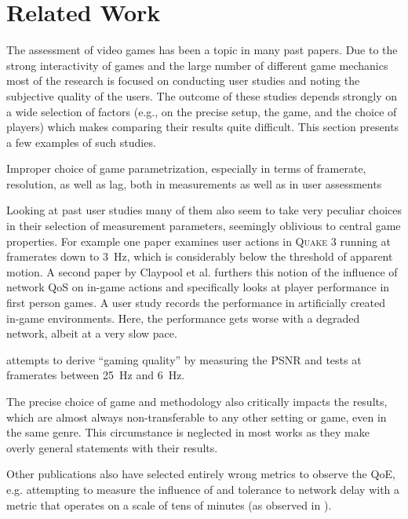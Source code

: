 \section{Related Work}
\label{sec:relatedwork}

The assessment of video games has been a topic in many past papers. Due to the strong interactivity of games and the large number of different game mechanics most of the research is focused on conducting user studies and noting the subjective quality of the users. The outcome of these studies depends strongly on a wide selection of factors (e.g., on the precise setup, the game, and the choice of players) which makes comparing their results quite difficult. This section presents a few examples of such studies.

Improper choice of game parametrization, especially in terms of framerate, resolution, as well as lag, both in measurements as well as in user assessments

Looking at past user studies many of them also seem to take very peculiar choices in their selection of measurement parameters, seemingly oblivious to central game properties. For example one paper \cite{claypool2007} examines user actions in \textsc{Quake 3} running at framerates down to \SI{3}{\hertz}, which is considerably below the threshold of apparent motion.
A second paper by Claypool et al. \cite{claypool2007} furthers this notion of the influence of network \gls{QoS} on in-game actions and specifically looks at player performance in first person games. A user study records the performance in artificially created in-game environments. Here, the performance gets worse with a degraded network, albeit at a very slow pace.

\cite{5506572} attempts to derive ``gaming quality'' by measuring the \acrshort{PSNR} and tests at framerates between \SI{25}{\hertz} and \SI{6}{\hertz}.



The precise choice of game and methodology also critically impacts the results, which are almost always non-transferable to any other setting or game, even in the same genre. This circumstance is neglected in most works as they make overly general statements with their results. %

Other publications also have selected entirely wrong metrics to observe the \gls{QoE}, e.g. attempting to measure the influence of and tolerance to network delay with a metric that operates on a scale of tens of minutes (as observed in \cite{Claypool:2006:LPA:1167838.1167860}).




